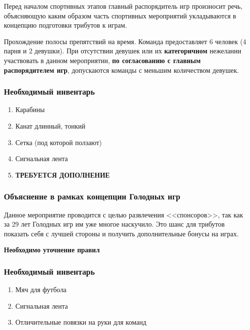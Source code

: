 
\par Перед началом спортивных этапов главный распорядитель игр произносит речь, объясняющую каким образом часть спортивных мероприятий укладываются в концепцию подготовки трибутов к играм.


\par Прохождение полосы препятствий на время. Команда предоставляет 6 человек (4 парня и 2 девушки). При отсутствии девушек или их \textbf{категоричном} нежелании участвовать в данном мероприятии, \textbf{по согласованию с главным распорядителем игр}, допускаются команды с меньшим количеством девушек.

\subsubsection*{Необходимый инвентарь}
\begin{enumerate}
\item Карабины
\item Канат длинный, тонкий
\item Сетка (под которой ползают)
\item Сигнальная лента
\item \textbf{ТРЕБУЕТСЯ ДОПОЛНЕНИЕ}
\end{enumerate}





\subsubsection*{Объяснение в рамках концепции Голодных игр}
\par Данное мероприятие проводится с целью развлечения <<спонсоров>>, так как за 29 лет Голодных игр им уже многое наскучило. Это шанс для трибутов показать себя с лучшей стороны и получить дополнительные бонусы на играх.

\par \textbf{Необходимо уточнение правил}

\subsubsection*{Необходимый инвентарь}
\begin{enumerate}
\item Мяч для футбола
\item Сигнальная лента
\item Отличительные повязки на руки для команд
\end{enumerate}




